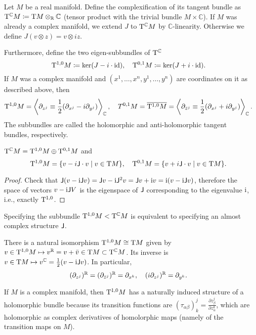 \begin{defn}
    Let $M$ be a real manifold. Define the complexification of its tangent bundle as $\mathrm{T}^\mathbb{C} M\coloneqq \mathrm{T} M\otimes_{\mathbb{R}} \mathbb{C}$ (tensor product with the trivial bundle $M\times \mathbb{C}$). If $M$ was already a complex manifold, we extend $J$ to $\mathrm{T}^\mathbb{C} M$ by $\mathbb{C}$-linearity. Otherwise we define $J(v\otimes z)=v\otimes iz$.
    
    Furthermore, define the two eigen-subbundles of $\mathrm{T}^\mathbb{C}$
    \[\mathrm{T}^{1,0}M\coloneqq \ker(J-i\cdot \operatorname{id}),\quad \mathrm{T}^{0,1}M\coloneqq\ker(J+i\cdot\operatorname{id}).\]
    If $M$ was a complex manifold and $(x^1,\ldots,x^n,y^1,\ldots,y^n)$ are coordinates on it as described above, then 
    \[\mathrm{T}^{1,0}M=\left\langle\partial_{z^j}\equiv \frac12(\partial_{x^j}-i\partial_{y^j})\right\rangle_{\mathbb{C}},\quad T^{0,1}M=\overline{\mathrm{T}^{1,0}M}=\left\langle\partial_{\bar z^j}\equiv \frac12(\partial_{x^j}+i\partial_{y^j})\right\rangle_{\mathbb{C}}.\]
    The subbundles are called the holomorphic and anti-holomorphic tangent bundles, respectively.
\end{defn}

\begin{prop}
    $\mathrm{T}^\mathbb{C}M=\mathrm{T}^{1,0}M\oplus \mathrm{T}^{0,1}M$ and 
    \[\mathrm{T}^{1,0}M=\{v-i\mathsf{J}\cdot v\mid v\in \mathrm{T} M \}, \quad \mathrm{T}^{0,1}M=\{v+i\mathsf{J}\cdot v\mid v\in \mathrm{T} M \}.\]
\end{prop}
\begin{proof}
    Check that $\mathsf{J}(v-\mathrm{i}\mathsf{J} v)=\mathsf{J} v-\mathrm{i}\mathsf{J}^2v=\mathsf{J} v+\mathrm{i} v=\mathrm{i}(v-\mathrm{i}\mathsf{J} v)$, therefore the space of vectors $v-\mathrm{i}\mathsf{J} V$ is the eigenspace of $\mathsf{J}$ corresponding to the eigenvalue $\mathrm{i}$, i.e., exactly $\mathrm{T}^{1,0}$.
\end{proof}

Specifying the subbundle $\mathrm{T}^{1,0}M<\mathrm{T}^\mathbb{C}M$ is equivalent to specifying an almost complex structure $\mathsf{J}$.

There is a natural isomorphism $\mathrm{T}^{1,0}M\cong \mathrm{T} M$ given by $v\in \mathrm{T}^{1,0}M\mapsto v^{\mathbb{R}} =v+\bar v\in \mathrm{T} M\subset \mathrm{T}^\mathbb{C} M$. Its inverse is $v\in \mathrm{T} M\mapsto v^\mathbb{C}=\frac12(v-\mathrm{i}\mathsf{J} v)$. In particular,
\[(\partial_{z^j})^{\mathbb{R}} =(\partial_{\bar z^j})^{\mathbb{R}} =\partial_{x^k},\quad (i\partial_{z^j})^{\mathbb{R}} =\partial_{y^k}.\]

If $M$ is a complex manifold, then $\mathrm{T}^{1,0}M$ has a naturally induced structure of a holomorphic bundle because its transition functions are $(\tau_{\alpha\beta})^j_k=\frac{\partial z_\beta^j}{\partial z_\alpha^k}$, which are holomorphic as complex derivatives of homolorphic maps (namely of the transition maps on $M$).

